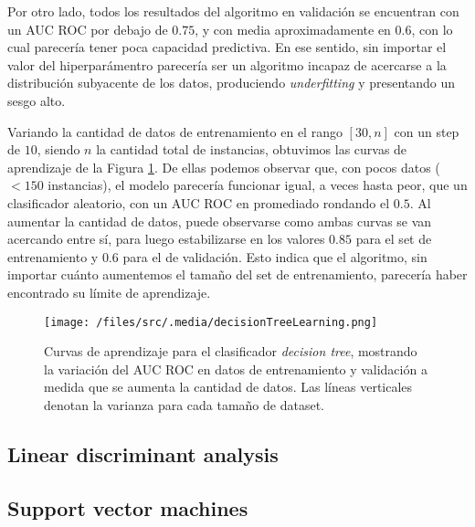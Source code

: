 Por otro lado, todos los resultados del algoritmo en validación se encuentran con un AUC ROC por debajo de $0.75$, y con media aproximadamente en $0.6$, con lo cual parecería tener poca capacidad predictiva. En ese sentido, sin importar el valor del hiperparámentro parecería ser un algoritmo incapaz de acercarse a la distribución subyacente de los datos, produciendo \textit{underfitting} y presentando un sesgo alto.


Variando la cantidad de datos de entrenamiento en el rango $[30, n]$ con un step de $10$, siendo $n$ la cantidad total de instancias, obtuvimos las curvas de aprendizaje de la Figura \ref{decisionTreeLearning}. De ellas podemos observar que, con pocos datos ($< 150$ instancias), el modelo parecería funcionar igual, a veces hasta peor, que un clasificador aleatorio, con un AUC ROC en promediado rondando el $0.5$. Al aumentar la cantidad de datos, puede observarse como ambas curvas se van acercando entre sí, para luego estabilizarse en los valores $0.85$ para el set de entrenamiento y $0.6$ para el de validación. Esto indica que el algoritmo, sin importar cuánto aumentemos el tamaño del set de entrenamiento, parecería haber encontrado su límite de aprendizaje.

\begin{figure}[!htbp]
    \centering
    \texttt{[image: /files/src/.media/decisionTreeLearning.png]}
    \caption{Curvas de aprendizaje para el clasificador \textit{decision tree}, mostrando la variación del AUC ROC en datos de entrenamiento y validación a medida que se aumenta la cantidad de datos. Las líneas verticales denotan la varianza para cada tamaño de dataset.}
    \label{decisionTreeLearning}
\end{figure}

\subsection{Linear discriminant analysis}

\subsection{Support vector machines}

